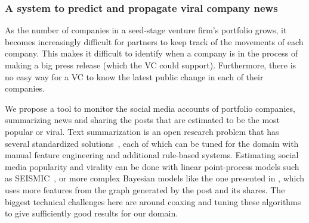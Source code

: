 \subsubsection{A system to predict and propagate viral company news}

As the number of companies in a seed-stage venture firm's portfolio grows, it becomes increasingly difficult for partners to keep track of the movements of each company. This makes it difficult to identify when a company is in the process of making a big press release (which the VC could support). Furthermore, there is no easy way for a VC to know the latest public change in each of their companies.

We propose a tool to monitor the social media accounts of portfolio companies, summarizing news and sharing the posts that are estimated to be the most popular or viral. Text summarization is an open research problem that has several standardized solutions~\cite{textsummarization}, each of which can be tuned for the domain with manual feature engineering and additional rule-based systems. Estimating social media popularity and virality can be done with linear point-process models such as SEISMIC~\cite{seismic}, or more complex Bayesian models like the one presented in \cite{bayesiantweets}, which uses more features from the graph generated by the post and its shares. The biggest technical challenges here are around coaxing and tuning these algorithms to give sufficiently good results for our domain.

\clearpage
\newpage

